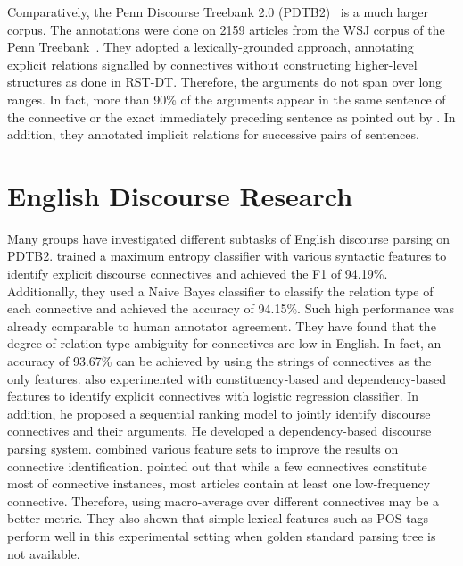 

Comparatively, the Penn Discourse Treebank 2.0 (PDTB2)~\citep{Prasad08thepenn}
is a much larger corpus. The annotations were done on 2159 articles from
the WSJ corpus of the Penn Treebank~\citep{marcus1993building}. They adopted a lexically-grounded
approach, annotating explicit relations signalled by connectives without constructing higher-level
structures as done in RST-DT. Therefore, the arguments do not span over long ranges. In fact,
more than 90\% of the arguments appear in the same sentence of the connective or the
exact immediately preceding sentence as pointed out by \cite{kong2014a}.
In addition, they annotated implicit relations for successive pairs of sentences.


\section{English Discourse Research}

Many groups have investigated different subtasks of English
discourse parsing on PDTB2. \cite{pitler2009using} trained a maximum
entropy classifier with various syntactic features to identify explicit discourse
connectives and achieved the F1 of 94.19\%. Additionally, they used
a Naive Bayes classifier to classify the relation type of each connective and
achieved the accuracy of 94.15\%. Such high performance was already comparable to human
annotator agreement. They have found that the degree of relation type ambiguity
for connectives are low in English. In fact, an accuracy of 93.67\% can be achieved
by using the strings of connectives as the only features. \cite{wellner2009sequence}
also experimented with constituency-based and dependency-based features to identify
explicit connectives with logistic regression classifier. In addition, he proposed
a sequential ranking model to jointly identify discourse connectives and their arguments.
He developed a dependency-based discourse parsing system. \cite{faiz2013identifying} combined
various feature sets to improve the results on connective identification. \cite{j2013disambig} pointed
out that while a few connectives constitute most of connective instances, most articles contain
at least one low-frequency connective. Therefore, using macro-average over different connectives
may be a better metric. They also shown that simple lexical features such as POS tags perform
well in this experimental setting when golden standard parsing tree is not available.

